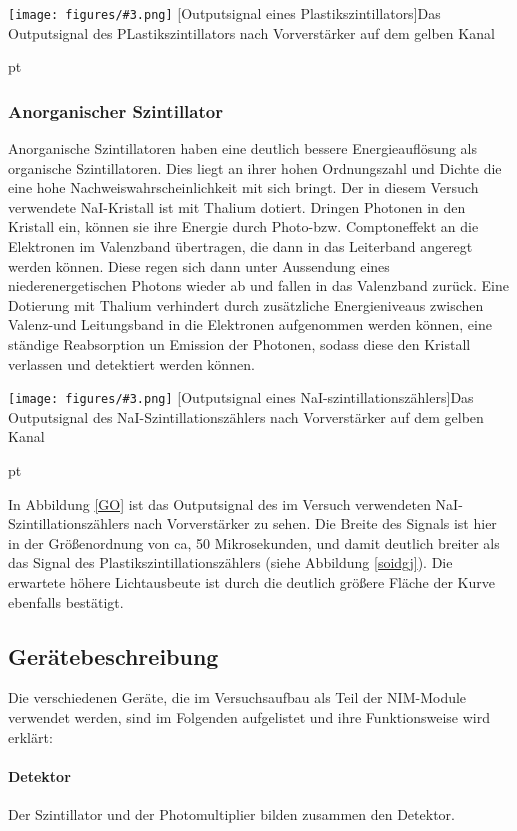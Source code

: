 \documentclass[12pt,listof=totoc]{scrartcl}
\newcommand{\graShort}[4][0.7]{
	\begin{minipage}[h!]{\textwidth}
		\centering
		\texttt{[image: figures/\#3.png]}
		\captionof{figure}[#2]{#4}
	\end{minipage}
	\vskip 30 pt
}
\begin{document}
 \graShort{Outputsignal eines Plastikszintillators}{Plastik-Szinti}{Das Outputsignal des PLastikszintillators nach Vorverstärker auf dem gelben Kanal  \label{soidgj}}

 \subsubsection{Anorganischer Szintillator \label{ASZ}}
 
 Anorganische Szintillatoren haben eine deutlich bessere Energieauflösung als organische Szintillatoren. Dies liegt an ihrer hohen Ordnungszahl und Dichte die eine hohe Nachweiswahrscheinlichkeit mit sich bringt. Der in diesem Versuch verwendete NaI-Kristall ist mit Thalium dotiert. 
 Dringen Photonen in den Kristall ein, können sie ihre Energie durch Photo-bzw. Comptoneffekt an die Elektronen im Valenzband übertragen, die dann in das Leiterband angeregt werden können. Diese regen sich dann unter Aussendung eines niederenergetischen Photons wieder ab und fallen in das Valenzband zurück. Eine Dotierung mit Thalium verhindert durch zusätzliche Energieniveaus zwischen Valenz-und Leitungsband in die Elektronen aufgenommen werden können, eine ständige Reabsorption un Emission der Photonen, sodass diese den Kristall verlassen und detektiert werden können.
 
  \graShort{Outputsignal eines NaI-szintillationszählers}{NaI-Szinti}{Das Outputsignal des NaI-Szintillationszählers nach Vorverstärker auf dem gelben Kanal \label{GO}}
  
  In Abbildung \ref{GO} ist das Outputsignal des im Versuch verwendeten NaI-Szintillationszählers nach Vorverstärker zu sehen. Die Breite des Signals ist hier in der Größenordnung von ca, 50 Mikrosekunden, und damit deutlich breiter als das Signal des Plastikszintillationszählers (siehe Abbildung \ref{soidgj}). Die erwartete höhere Lichtausbeute ist durch die deutlich größere Fläche der Kurve ebenfalls bestätigt.
 \subsection{Gerätebeschreibung \label{Geräte}}
 
 Die verschiedenen Geräte, die im Versuchsaufbau als Teil der NIM-Module verwendet werden, sind im Folgenden aufgelistet und ihre Funktionsweise wird erklärt:
 
 \paragraph{Detektor} Der Szintillator und der Photomultiplier bilden zusammen den Detektor.
\end{document}
